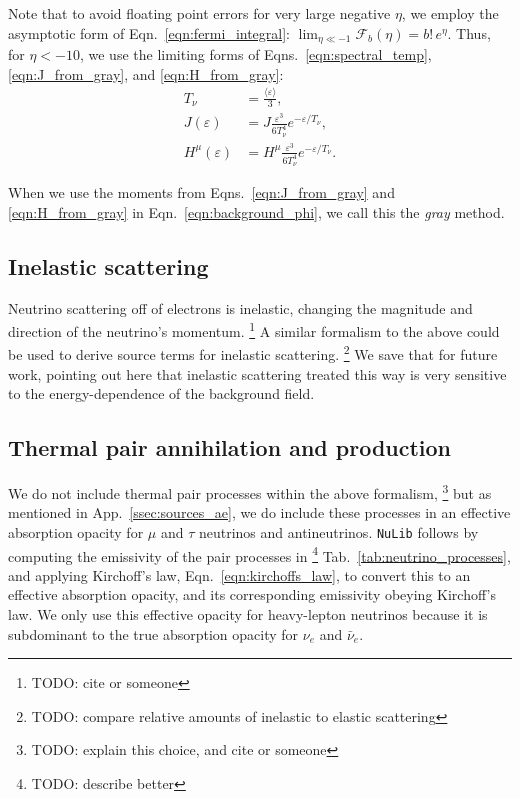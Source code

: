 \documentclass[aps,floatfix,prd,superscriptaddress,twocolumn]{revtex4-1}
\begin{document}
Note that to avoid floating point errors for very large negative $\eta$,
we employ the asymptotic form of Eqn.~\ref{eqn:fermi_integral}:
$\lim_{\eta\ll-1}\mathscr{F}_b(\eta) = b!\,e^\eta$.
Thus, for $\eta<-10$, we use the limiting forms of
Eqns.~\ref{eqn:spectral_temp},
\ref{eqn:J_from_gray},
and \ref{eqn:H_from_gray}:
\begin{align}
    T_\nu &= 
    \frac{\langle \varepsilon \rangle}{3}, \\
    J(\varepsilon) &=
    J \frac{\varepsilon^3}{6 T_\nu^4} e^{-\varepsilon/T_\nu}, \\
    H^\mu(\varepsilon) &=
    H^\mu \frac{\varepsilon^3}{6 T_\nu^4} e^{-\varepsilon/T_\nu}.
\end{align}

When we use the moments from Eqns.~\ref{eqn:J_from_gray} and
\ref{eqn:H_from_gray} in Eqn.~\ref{eqn:background_phi},
we call this the \emph{gray} method.

\subsection{Inelastic scattering}
\label{ssec:sources_si}
Neutrino scattering off of electrons is inelastic, changing the
magnitude and direction of the neutrino's momentum.
\footnote{TODO: cite \cite{keil2003-pinched_spectra} or someone}
A similar formalism to the above could be used to derive source terms
for inelastic scattering.
\footnote{TODO: compare relative amounts of inelastic to elastic scattering}
We save that for future work, pointing out here that inelastic scattering
treated this way is very sensitive to the energy-dependence of
the background field.

\subsection{Thermal pair annihilation and production}
\label{ssec:sources_pp}
We do not include thermal pair processes within the above formalism,
\footnote{TODO: explain this choice, and cite \cite{keil2003-pinched_spectra} or someone}
but as mentioned in App.~\ref{ssec:sources_ae}, we do include
these processes in an effective absorption opacity for $\mu$ and $\tau$
neutrinos and antineutrinos. \lstinline{NuLib} follows
\cite{brue1985-core_collapse,burr2006-neutrino_opacities}
by computing the emissivity of the pair processes in
\footnote{TODO: describe better}
Tab.~\ref{tab:neutrino_processes}, and applying Kirchoff's law,
Eqn.~\ref{eqn:kirchoffs_law}, to convert this to an effective absorption opacity,
and its corresponding emissivity obeying Kirchoff's law.
We only use this effective opacity for heavy-lepton neutrinos because
it is subdominant to the true absorption opacity for
$\nu_e$ and $\bar{\nu}_e$.


\end{document}

